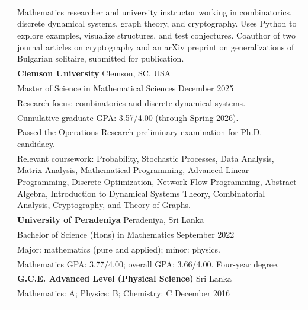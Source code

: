\documentclass[letterpaper,11pt]{article}
\newcommand{\cvspace}{\noalign{\vskip 6pt}}
\begin{document}
\setlength{\tabcolsep}{8pt}
\setlength{\LTpre}{0pt}
\setlength{\LTpost}{0pt}
\begin{longtable}[t]{@{}>{\raggedright\arraybackslash}p{1.3in}>{\raggedright\arraybackslash}p{4.8in}@{}}

\textbf{\color{OliveGreen}{Summary}}
& Mathematics researcher and university instructor working in combinatorics,
discrete dynamical systems, graph theory, and cryptography. Uses Python to
explore examples, visualize structures, and test conjectures. Coauthor of two
journal articles on cryptography and an arXiv preprint on generalizations of Bulgarian solitaire, submitted for publication. \\
\cvspace

\textbf{\color{OliveGreen}{Education and}}
& \textbf{Clemson University} \hfill Clemson, SC, USA \\*
\textbf{\color{OliveGreen}{Training}}
& Master of Science in Mathematical Sciences \hfill December 2025 \\*
& Research focus: combinatorics and discrete dynamical systems. \\
& Cumulative graduate GPA: 3.57/4.00 (through Spring 2026). \\
& Passed the Operations Research preliminary examination for Ph.D. candidacy. \\
& Relevant coursework: Probability, Stochastic Processes,
Data Analysis, Matrix Analysis,
Mathematical Programming,
Advanced Linear Programming,
Discrete Optimization,
Network Flow Programming,
Abstract Algebra,
Introduction to Dynamical Systems Theory,
Combinatorial Analysis,
Cryptography, and
Theory of Graphs.\\
\cvspace

& \textbf{University of Peradeniya} \hfill Peradeniya, Sri Lanka \\*
& Bachelor of Science (Hons) in Mathematics \hfill September 2022 \\*
& Major: mathematics (pure and applied); minor: physics. \\
& Mathematics GPA: 3.77/4.00; overall GPA: 3.66/4.00. Four-year degree. \\
\cvspace

& \textbf{G.C.E. Advanced Level (Physical Science)} \hfill Sri Lanka \\*
& Mathematics: A; Physics: B; Chemistry: C \hfill December 2016 \\
\cvspace


\end{longtable}
\end{document}
